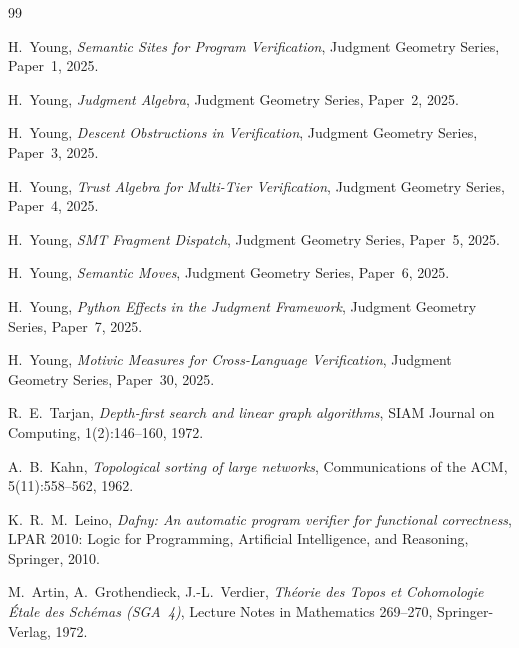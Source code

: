\documentclass[11pt]{article}
\begin{document}
\begin{thebibliography}{99}

H.~Young,
\emph{Semantic Sites for Program Verification},
Judgment Geometry Series, Paper~1, 2025.

H.~Young,
\emph{Judgment Algebra},
Judgment Geometry Series, Paper~2, 2025.

H.~Young,
\emph{Descent Obstructions in Verification},
Judgment Geometry Series, Paper~3, 2025.

H.~Young,
\emph{Trust Algebra for Multi-Tier Verification},
Judgment Geometry Series, Paper~4, 2025.

H.~Young,
\emph{SMT Fragment Dispatch},
Judgment Geometry Series, Paper~5, 2025.

H.~Young,
\emph{Semantic Moves},
Judgment Geometry Series, Paper~6, 2025.

H.~Young,
\emph{Python Effects in the Judgment Framework},
Judgment Geometry Series, Paper~7, 2025.

H.~Young,
\emph{Motivic Measures for Cross-Language Verification},
Judgment Geometry Series, Paper~30, 2025.

R.~E.~Tarjan,
\emph{Depth-first search and linear graph algorithms},
SIAM Journal on Computing, 1(2):146--160, 1972.

A.~B.~Kahn,
\emph{Topological sorting of large networks},
Communications of the ACM, 5(11):558--562, 1962.

K.~R.~M.~Leino,
\emph{Dafny: An automatic program verifier for functional correctness},
LPAR 2010: Logic for Programming, Artificial Intelligence,
and Reasoning, Springer, 2010.

M.~Artin, A.~Grothendieck, J.-L.~Verdier,
\emph{Th\'eorie des Topos et Cohomologie \'Etale
      des Sch\'emas (SGA~4)},
Lecture Notes in Mathematics 269--270, Springer-Verlag, 1972.

\end{thebibliography}
\end{document}
